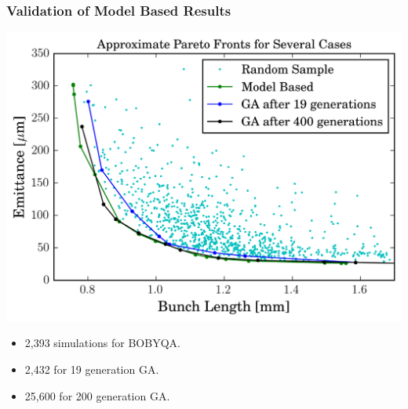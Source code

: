 \documentclass[professionalfonts,t]{beamer}
\begin{document}
{\begin{frame}
\frametitle{Validation of Model Based Results}
\vspace{-0.5em}
\centering
\includegraphics[width=0.65\linewidth]{../../tex/images/model_vs_ga}
\begin{itemize}
	\item 2,393 simulations for BOBYQA.
	\item 2,432 for 19 generation GA.
	\item 25,600 for 200 generation GA.
\end{itemize}
\end{frame}
}%
\end{document}
